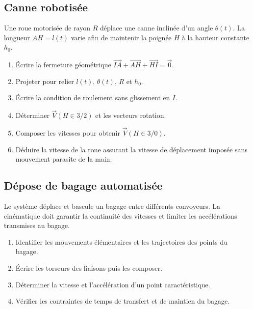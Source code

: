 \subsection{Canne robotisée}

Une roue motorisée de rayon $R$ déplace une canne inclinée d'un angle
$\theta(t)$. La longueur $AH=l(t)$ varie afin de maintenir la poignée
$H$ à la hauteur constante $h_0$.

\begin{center}
\hfill
{}
\end{center}

\begin{enumerate}
  \item Écrire la fermeture géométrique $\overrightarrow{IA}+\overrightarrow{AH}+\overrightarrow{HI}=\vec0$.
  \item Projeter pour relier $l(t)$, $\theta(t)$, $R$ et $h_0$.
  \item Écrire la condition de roulement sans glissement en $I$.
  \item Déterminer $\vec V(H\in3/2)$ et les vecteurs rotation.
  \item Composer les vitesses pour obtenir $\vec V(H\in3/0)$.
  \item Déduire la vitesse de la roue assurant la vitesse de déplacement imposée sans mouvement parasite de la main.
\end{enumerate}

\subsection{Dépose de bagage automatisée}

Le système déplace et bascule un bagage entre différents convoyeurs. La
cinématique doit garantir la continuité des vitesses et limiter les
accélérations transmises au bagage.

\begin{center}
\hfill
{}\hfill
{}
\end{center}

\begin{enumerate}
  \item Identifier les mouvements élémentaires et les trajectoires des points du bagage.
  \item Écrire les torseurs des liaisons puis les composer.
  \item Déterminer la vitesse et l'accélération d'un point caractéristique.
  \item Vérifier les contraintes de temps de transfert et de maintien du bagage.
\end{enumerate}

